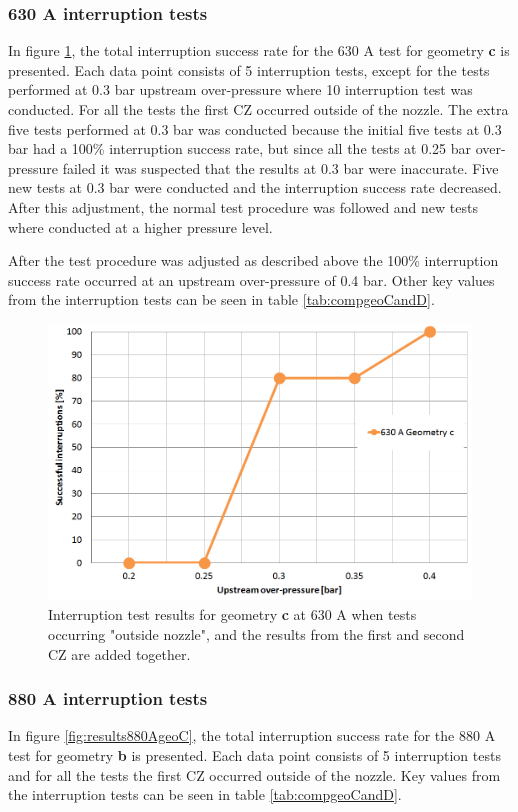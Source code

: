 \documentclass[10pt,b5paper,twoside]{article}
\begin{document}
\subsubsection*{630 A interruption tests}
In figure \ref{fig:results630AgeoC}, the total interruption success rate for the 630 A test for geometry \textbf{c} is presented. Each data point consists of 5 interruption tests, except for the tests performed at 0.3 bar upstream over-pressure where 10 interruption test was conducted. For all the tests the first CZ occurred outside of the nozzle. The extra five tests performed at 0.3 bar was conducted because the initial five tests at 0.3 bar had a 100\% interruption success rate, but since all the tests at 0.25 bar over-pressure failed it was suspected that the results at 0.3 bar were inaccurate. Five new tests at 0.3 bar were conducted and the interruption success rate decreased. After this adjustment, the normal test procedure was followed and new tests where conducted at a higher pressure level.

After the test procedure was adjusted as described above the 100\% interruption success rate occurred at an upstream over-pressure of 0.4 bar. Other key values from the interruption tests can be seen in table \ref{tab:compgeoCandD}.

\begin{figure}[H]
\centering
\includegraphics[scale=0.45]{Bilder/Results/geoC630amp.PNG}
\caption{Interruption test results for geometry \textbf{c} at 630 A when tests occurring "outside nozzle", and the results from the first and second CZ are added together.} \label{fig:results630AgeoC}
\end{figure}

\subsubsection*{880 A interruption tests}
In figure \ref{fig:results880AgeoC}, the total interruption success rate for the 880 A test for geometry \textbf{b} is presented. Each data point consists of 5 interruption tests and for all the tests the first CZ occurred outside of the nozzle. Key values from the interruption tests can be seen in table \ref{tab:compgeoCandD}. 
\end{document}
